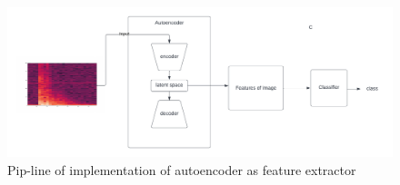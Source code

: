       \begin{figure}[h]
      	\centering
      	\includegraphics[width=1.2\linewidth]{images/ee.png}
      	\caption{Pip-line of implementation of autoencoder as feature extractor }
      	\label{ne11}
      \end{figure}
      


